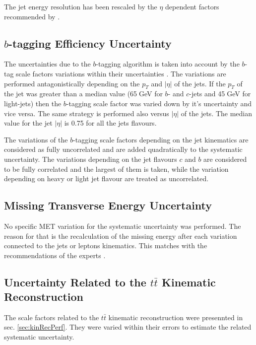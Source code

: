 The jet energy resolution has been rescaled by the $\eta$ dependent factors recommended by \cite{TWikiSystJER}.

\subsection{$b$-tagging Efficiency Uncertainty}

The uncertainties due to the $b$-tagging algorithm is taken into account by the $b$-tag scale factors variations within their
uncertainties \cite{CMS-PAS-BTV-13-001}. The variations are performed antagonistically depending on the $p_{T}$ and $|\eta|$ of the jets.
If the $p_{T}$ of the jet was greater than a median value (65$\;$GeV for $b$- and $c$-jets and 45$\;$GeV for light-jets) then 
the $b$-tagging scale factor was varied down by it's uncertainty and vice versa. The same strategy is performed also versus $|\eta|$
of the jets. The median value for the jet $|\eta|$ is 0.75 for all the jets flavours.

The variations of the $b$-tagging scale factors depending on the jet kinematics are considered as fully uncorrelated and are added
quadratically to the systematic uncertainty. The variations depending on the jet flavours $c$ and $b$ are considered to be 
fully correlated and the largest of them is taken, while the variation depending on heavy or light jet flavour are treated as uncorrelated.

\subsection{Missing Transverse Energy Uncertainty}

No specific MET variation for the systematic uncertainty was performed. The reason for that is the recalculation of the missing energy
after each variation connected to the jets or leptons kinematics. This matches with the recommendations of the experts \cite{CMS-PAS-JME-12-002}.

\subsection{Uncertainty Related to the $t\bar{t}$ Kinematic Reconstruction}

The scale factors related to the $t\bar{t}$ kinematic reconstruction were presennted in sec. \ref{sec:kinRecPerf}. They were varied 
within their errors to estimate the related systematic uncertainty.

